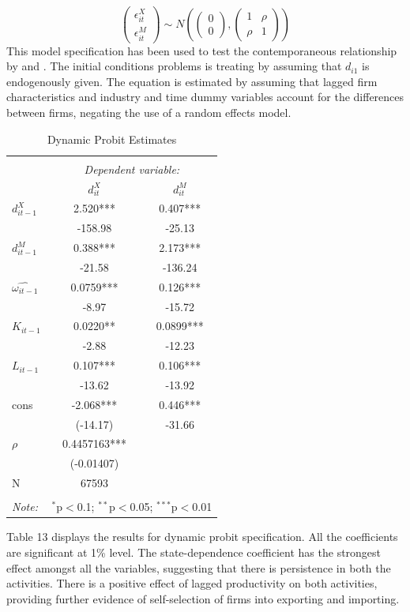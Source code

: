 \documentclass[11pt]{article}
\begin{document}
\[\begin{pmatrix}
\epsilon_{it}^{X} \\
\epsilon_{it}^{M}
\end{pmatrix}\sim N\left(\begin{pmatrix}
0 \\
0
\end{pmatrix},\begin{pmatrix}
1 & \rho \\
\rho & 1
\end{pmatrix}\right)
\]
This model specification has been used to test the contemporaneous relationship
by \cite{aristei2013firms} and \cite{aw2011}. 
The initial conditions problems is treating by assuming that $d_{i1}$ is 
endogenously given. The  equation is estimated by assuming that lagged
firm characteristics and industry and time  dummy variables account
for the differences between firms, negating the use of a random
effects model. 
\begin{center}
\begin{table}[htbp]
\caption{Dynamic Probit Estimates}
\begin{tabular}{@{\extracolsep{5pt}}lcc} 
\\[-1.8ex]\hline 
\hline \\[-1.8ex] 
 & \multicolumn{2}{c}{\textit{Dependent variable:}} \\ 
 & $d_{it}^{X}$ & $d_{it}^{M}$ \\
\cline{2-3} 

$d_{it-1}^{X}$ & 2.520*** & 0.407*** \\
 & -158.98 & -25.13 \\
$d_{it-1}^{M}$ & 0.388*** & 2.173*** \\
 & -21.58 & -136.24 \\
$\hat{\omega_{it-1}}$ & 0.0759*** & 0.126*** \\
 & -8.97 & -15.72 \\
$K_{it-1}$ & 0.0220** & 0.0899*** \\
 & -2.88 & -12.23 \\
$L_{it-1}$ & 0.107*** & 0.106*** \\
 & -13.62 & -13.92 \\
cons & -2.068*** & 0.446*** \\
 & (-14.17) & -31.66 \\
$\rho$ & 0.4457163*** &  \\
 & (-0.01407) &  \\
N & 67593 &  \\
\hline 
\hline \\[-1.8ex] 
\textit{Note:}  & \multicolumn{2}{r}{$^{*}$p$<$0.1; $^{**}$p$<$0.05; $^{***}$p$<$0.01} \\ 
\end{tabular}
\end{table}
\end{center}
Table 13 displays the results for dynamic probit specification. All
  the coefficients are significant at 1\% level.  The
  state-dependence coefficient has the strongest effect amongst all
  the variables, suggesting that there is persistence in both the
  activities. There is a positive effect of lagged
  productivity on both activities, providing further evidence of
  self-selection of firms into exporting and importing. 
\end{document}
